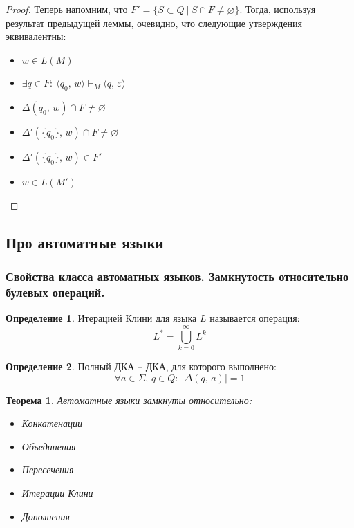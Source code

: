 \documentclass[a4paper,12pt]{article}
\renewcommand{\emptyset}{\ensuremath{\varnothing}}
\theoremstyle{plain}
\newtheorem{theorem}{Теорема}[subsection]
\theoremstyle{definition}
\newtheorem{definition}{Определение}[subsection]
\theoremstyle{remark}
\begin{document}
\begin{proof}
	Теперь напомним, что $F' = \{S \subset Q \:|\: S \cap F \neq \emptyset\}$. Тогда, используя результат предыдущей леммы, очевидно, что следующие утверждения эквивалентны:
	\begin{itemize}
		\item $w \in L(M)$
		\item $\exists q \in F :\: \langle q_0,\, w\rangle \vdash_M \langle q,\, \varepsilon\rangle$
		\item $\Delta(q_0,\, w) \cap F \neq \emptyset$
		\item $\Delta'(\{q_0\},\, w) \cap F \neq \emptyset$
		\item $\Delta'(\{q_0\},\, w) \in F'$
		\item $w \in L(M')$
	\end{itemize}
\end{proof}

\subsection{Про автоматные языки}
\subsubsection*{Свойства класса автоматных языков. Замкнутость относительно булевых операций.}
\begin{definition}
	Итерацией Клини для языка $L$ называется операция:
	\[L^* = \bigcup_{k = 0}^\infty L^k\]
\end{definition}

\begin{definition}
	Полный ДКА -- ДКА, для которого выполнено:
	\[
		\forall a \in \Sigma,\, q \in Q :\: |\Delta(q,\, a)| = 1
	\]
\end{definition}

\begin{theorem}
	Автоматные языки замкнуты относительно:
	\begin{itemize}
		\item Конкатенации
		\item Объединения
		\item Пересечения
		\item Итерации Клини
		\item Дополнения
	\end{itemize}
\end{theorem}
\end{document}
